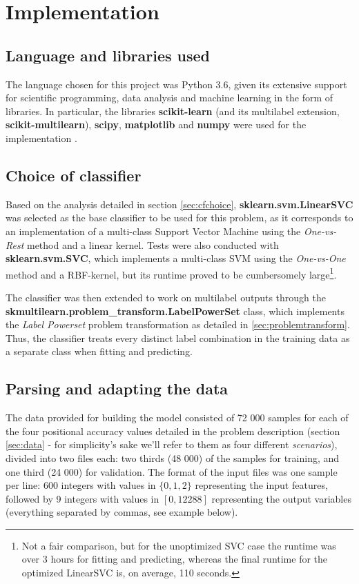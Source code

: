 \documentclass{kthreport}
\theoremstyle{definition}
\begin{document}
\section{Implementation}

\subsection{Language and libraries used}

The language chosen for this project was Python 3.6, given its extensive support for scientific programming, data analysis and machine learning in the form of libraries. In particular, the libraries \textbf{scikit-learn} (and its multilabel extension, \textbf{scikit-multilearn}), \textbf{scipy}, \textbf{matplotlib} and \textbf{numpy} were used for the implementation \autocite{scikit-learn,scikit-multilearn,scipy,matplotlib,numpy}.

\subsection{Choice of classifier}

Based on the analysis detailed in section \ref{sec:cfchoice}, \textbf{sklearn.svm.LinearSVC} was selected as the base classifier to be used for this problem, as it corresponds to an implementation of a multi-class Support Vector Machine using the \emph{One-vs-Rest} method and a linear kernel. Tests were also conducted with \textbf{sklearn.svm.SVC}, which implements a multi-class SVM using the \emph{One-vs-One} method and a RBF-kernel, but its runtime proved to be cumbersomely large\footnote{Not a fair comparison, but for the unoptimized SVC case the runtime was over 3 hours for fitting and predicting, whereas the final runtime for the optimized LinearSVC is, on average, 110 seconds.}.

The classifier was then extended to work on multilabel outputs through the \textbf{skmultilearn.problem\_transform.LabelPowerSet} class, which implements the \emph{Label Powerset} problem transformation as detailed in \ref{sec:problemtransform}. 
Thus, the classifier treats every distinct label combination in the training data as a separate class when fitting and predicting.

\subsection{Parsing and adapting the data}

The data provided for building the model consisted of 72 000 samples for each of the four positional accuracy values detailed in the problem description (section \ref{sec:data} - for simplicity's sake we'll refer to them as four different \emph{scenarios}), divided into two files each: two thirds (48 000) of the samples for training, and one third (24 000) for validation. The format of the input files was one sample per line: 600 integers with values in $\{0, 1, 2\}$ representing the input features, followed by 9 integers with values in $[0, 12288]$ representing the output variables (everything separated by commas, see example below).
\end{document}
